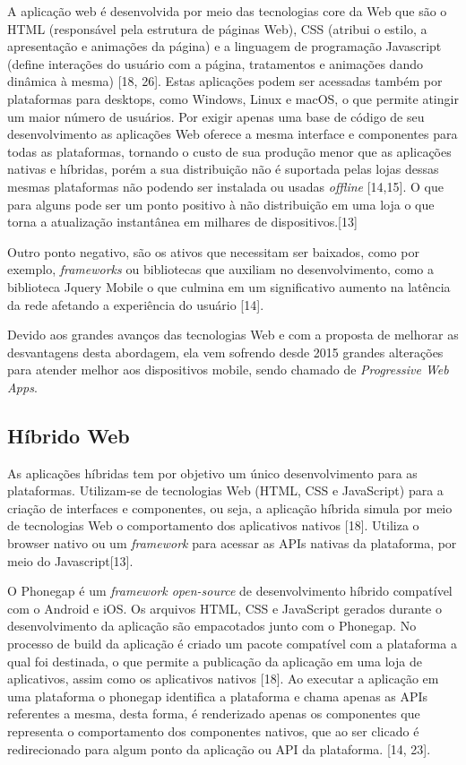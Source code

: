 A aplicação web é desenvolvida por meio das tecnologias core da Web que são o HTML (responsável pela estrutura de páginas Web), CSS (atribui o estilo, a apresentação e animações da página) e a linguagem de programação Javascript (define interações do usuário com a página, tratamentos e animações dando dinâmica à mesma) [18, 26]. Estas aplicações podem ser acessadas também por plataformas para desktops, como Windows, Linux e macOS, o que permite atingir um maior número de usuários. Por exigir apenas uma base de código de seu desenvolvimento as aplicações Web oferece a mesma interface e componentes para todas as plataformas, tornando o custo de sua produção menor que as aplicações nativas e híbridas, porém a sua distribuição não é suportada pelas lojas dessas mesmas plataformas não podendo ser instalada ou usadas \textit{offline} [14,15]. O que para alguns pode ser um ponto positivo à não distribuição em uma loja o que torna a atualização instantânea em milhares de dispositivos.[13]

Outro ponto negativo, são os ativos que necessitam ser baixados, como por exemplo, \textit{frameworks} ou bibliotecas que auxiliam no desenvolvimento, como a biblioteca Jquery Mobile o que culmina em um significativo aumento na latência da rede afetando a experiência do usuário [14].

Devido aos grandes avanços das tecnologias Web e com a proposta de melhorar as desvantagens desta abordagem, ela vem sofrendo desde 2015 grandes alterações para atender melhor aos dispositivos mobile, sendo chamado de \textit{Progressive Web Apps}.

\subsection{\esp Híbrido Web}

As aplicações híbridas tem por objetivo um único desenvolvimento para as plataformas. Utilizam-se de tecnologias Web (HTML, CSS e JavaScript) para a criação de interfaces e componentes, ou seja, a aplicação híbrida simula por meio de tecnologias Web o comportamento dos aplicativos nativos [18]. Utiliza o browser nativo ou um \textit{framework} para acessar as APIs nativas da plataforma, por meio do Javascript[13].

O Phonegap é um \textit{framework open-source} de desenvolvimento híbrido compatível com o Android e iOS. Os arquivos HTML, CSS e JavaScript gerados durante o desenvolvimento da aplicação são empacotados junto com o Phonegap. No processo de build da aplicação é criado um pacote compatível com a plataforma a qual foi destinada, o que permite a publicação da aplicação em uma loja de aplicativos, assim como os aplicativos nativos [18]. Ao executar a aplicação em uma plataforma o phonegap identifica a plataforma e chama apenas as APIs referentes a mesma, desta forma, é renderizado apenas os componentes que representa o comportamento dos componentes nativos, que ao ser clicado é redirecionado para algum ponto da aplicação ou API da plataforma. [14, 23].

